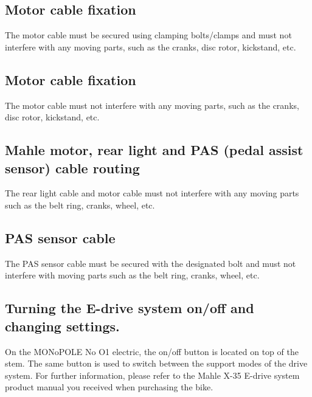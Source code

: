 \documentclass[12 pt]{article}
\newcommand{\bodyimage}[1]{\rightline{}}}
\begin{document}
\bodyimage{5_1_no_o1_electric_mahle_iwoc_one.svg}

\subsection{Motor cable fixation}

The motor cable must be secured using clamping bolts/clamps and must
not interfere with any moving parts, such as the cranks, disc rotor,
kickstand, etc.

\bodyimage{5_3_no_o1_electric_bolt_clamps.svg}

\subsection{Motor cable fixation}

The motor cable must not interfere with any moving parts, such as the
cranks, disc rotor, kickstand, etc.

\bodyimage{5_2_no_o1_electric_motor_cable.svg}

\subsection{Mahle motor, rear light and PAS (pedal assist sensor) cable routing}

The rear light cable and motor cable must not interfere with any
moving parts such as the belt ring, cranks, wheel, etc.

\bodyimage{5_4_no_o1_electric_sensor_motor_cable.svg}

\subsection{PAS sensor cable}

The PAS sensor cable must be secured with the designated bolt and must
not interfere with moving parts such as the belt ring, cranks, wheel,
etc.

\bodyimage{5_5_no_o1_electric_pas_sensor.svg}

\subsection{Turning the E-drive system on/off and changing settings.}

On the MONoPOLE No O1 electric, the on/off button is located on top of
the stem. The same button is used to switch between the support modes
of the drive system. For further information, please refer to the
Mahle X-35 E-drive system product manual you received when purchasing
the bike.
\end{document}
